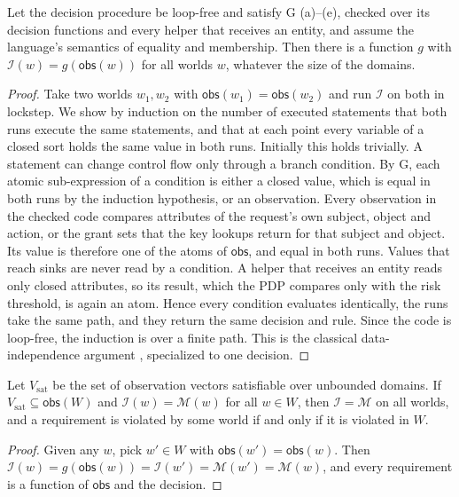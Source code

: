 \documentclass[sigconf,review,anonymous]{acmart}
\newcommand{\obs}{\mathsf{obs}}
\begin{document}
\begin{lemma}\label{lem:di}
Let the decision procedure be loop-free and satisfy G (a)--(e), checked over its decision functions and every
helper that receives an entity, and assume the language's semantics of equality and membership. Then there is a
function $g$ with $\mathcal{I}(w)=g(\obs(w))$ for all worlds $w$, whatever the size of the domains.
\end{lemma}
\begin{proof}
Take two worlds $w_1,w_2$ with $\obs(w_1)=\obs(w_2)$ and run $\mathcal{I}$ on both in lockstep. We show by
induction on the number of executed statements that both runs execute the same statements, and that at each
point every variable of a closed sort holds the same value in both runs. Initially this holds trivially. A
statement can change control flow only through a branch condition. By G, each atomic sub-expression of a
condition is either a closed value, which is equal in both runs by the induction hypothesis, or an observation.
Every observation in the checked code compares attributes of the request's own subject, object and action, or
the grant sets that the key lookups return for that subject and object. Its value is therefore one of the
atoms of $\obs$, and equal in both runs. Values that reach sinks are never read by a condition. A helper that
receives an entity reads only closed attributes, so its result, which the PDP compares only with the risk
threshold, is again an atom. Hence every condition evaluates identically, the runs take the same path, and
they return the same decision and rule. Since the code is loop-free, the induction is over a finite path. This
is the classical data-independence argument \cite{wolper1986,lazic2003semantic}, specialized to one decision.
\end{proof}

\begin{theorem}\label{thm:complete}
Let $V_{\mathrm{sat}}$ be the set of observation vectors satisfiable over unbounded domains. If
$V_{\mathrm{sat}}\subseteq\obs(W)$ and $\mathcal{I}(w)=\mathcal{M}(w)$ for all $w\in W$, then
$\mathcal{I}=\mathcal{M}$ on all worlds, and a requirement is violated by some world if and only if it is violated
in $W$.
\end{theorem}
\begin{proof}
Given any $w$, pick $w'\in W$ with $\obs(w')=\obs(w)$. Then $\mathcal{I}(w)=g(\obs(w))=\mathcal{I}(w')=
\mathcal{M}(w')=\mathcal{M}(w)$, and every requirement is a function of $\obs$ and the decision.
\end{proof}
\end{document}
